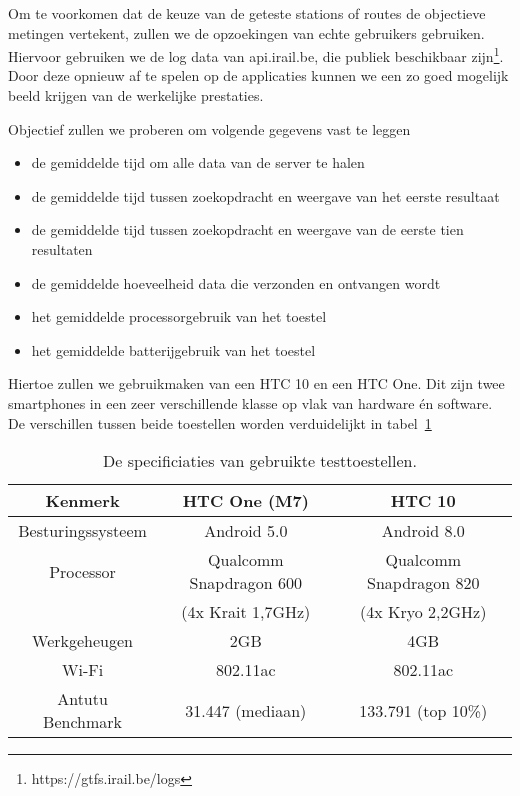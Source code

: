 Om te voorkomen dat de keuze van de geteste stations of routes de objectieve metingen vertekent, zullen we de opzoekingen van echte gebruikers gebruiken. Hiervoor gebruiken we de log data van api.irail.be, die publiek beschikbaar zijn\footnote{https://gtfs.irail.be/logs}. Door deze  opnieuw af te spelen op de applicaties kunnen we een zo goed mogelijk beeld krijgen van de werkelijke prestaties.

Objectief zullen we proberen om volgende gegevens vast te leggen
\begin{itemize}
	\item de gemiddelde tijd om alle data van de server te halen
	\item de gemiddelde tijd tussen zoekopdracht en weergave van het eerste resultaat
	\item de gemiddelde tijd tussen zoekopdracht en weergave van de eerste tien resultaten
	\item de gemiddelde hoeveelheid data die verzonden en ontvangen wordt
	\item het gemiddelde processorgebruik van het toestel
	\item het gemiddelde batterijgebruik van het toestel
\end{itemize}

Hiertoe zullen we gebruikmaken van een HTC 10 en een HTC One. Dit zijn twee smartphones in een zeer verschillende klasse op vlak van hardware én software. De verschillen tussen beide toestellen worden verduidelijkt in tabel~\ref{tab:testdevices}
\begin{table}[ht]
	\begin{tabular}{| c | c | c |}
		\hline
		Kenmerk & HTC One (M7) & HTC 10 \\
		\hline
		Besturingssysteem & Android 5.0 & Android 8.0 \\
		Processor & Qualcomm Snapdragon 600 & Qualcomm Snapdragon 820\\
		& (4x Krait 1,7GHz) & (4x Kryo 2,2GHz) \\
		Werkgeheugen & 2GB & 4GB \\
		Wi-Fi & 802.11ac & 802.11ac \\
		\hline
		Antutu Benchmark & 31.447 (mediaan)  & 133.791 (top 10\%) \\
		\hline
	\end{tabular}
	\caption[Specificaties van de toestellen gebruikt voor testen]{De specificiaties van gebruikte testtoestellen.}
	\label{tab:testdevices}
\end{table}

